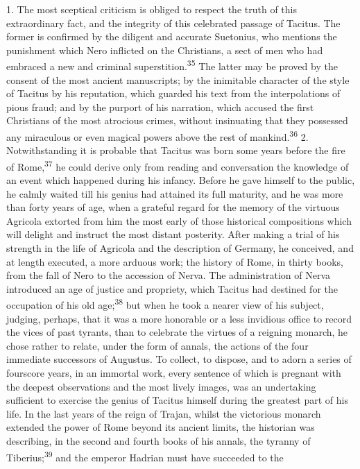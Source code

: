 1. The most sceptical criticism is obliged to respect the truth
of this extraordinary fact, and the integrity of this celebrated
passage of Tacitus. The former is confirmed by the diligent and
accurate Suetonius, who mentions the punishment which Nero
inflicted on the Christians, a sect of men who had embraced a new
and criminal superstition.\textsuperscript{35} The latter may be proved by the
consent of the most ancient manuscripts; by the inimitable
character of the style of Tacitus by his reputation, which
guarded his text from the interpolations of pious fraud; and by
the purport of his narration, which accused the first Christians
of the most atrocious crimes, without insinuating that they
possessed any miraculous or even magical powers above the rest of
mankind.\textsuperscript{36} 2. Notwithstanding it is probable that Tacitus was
born some years before the fire of Rome,\textsuperscript{37} he could derive only
from reading and conversation the knowledge of an event which
happened during his infancy. Before he gave himself to the
public, he calmly waited till his genius had attained its full
maturity, and he was more than forty years of age, when a
grateful regard for the memory of the virtuous Agricola extorted
from him the most early of those historical compositions which
will delight and instruct the most distant posterity. After
making a trial of his strength in the life of Agricola and the
description of Germany, he conceived, and at length executed, a
more arduous work; the history of Rome, in thirty books, from the
fall of Nero to the accession of Nerva. The administration of
Nerva introduced an age of justice and propriety, which Tacitus
had destined for the occupation of his old age;\textsuperscript{38} but when he
took a nearer view of his subject, judging, perhaps, that it was
a more honorable or a less invidious office to record the vices
of past tyrants, than to celebrate the virtues of a reigning
monarch, he chose rather to relate, under the form of annals, the
actions of the four immediate successors of Augustus. To collect,
to dispose, and to adorn a series of fourscore years, in an
immortal work, every sentence of which is pregnant with the
deepest observations and the most lively images, was an
undertaking sufficient to exercise the genius of Tacitus himself
during the greatest part of his life. In the last years of the
reign of Trajan, whilst the victorious monarch extended the power
of Rome beyond its ancient limits, the historian was describing,
in the second and fourth books of his annals, the tyranny of
Tiberius;\textsuperscript{39} and the emperor Hadrian must have succeeded to the
